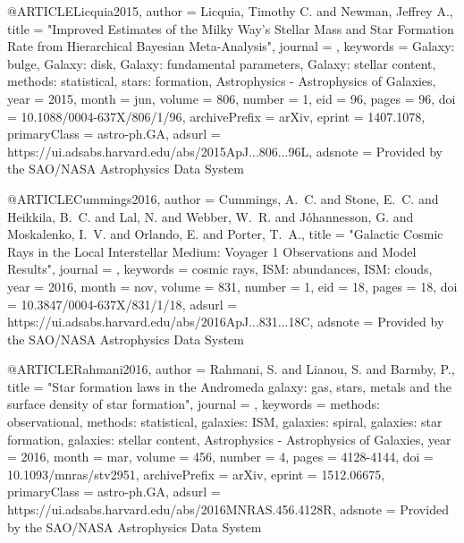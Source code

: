 \documentclass[useAMS,usenatbib]{mnras}
\begin{document}
@ARTICLE{Licquia2015,
       author = {{Licquia}, Timothy C. and {Newman}, Jeffrey A.},
        title = "{Improved Estimates of the Milky Way's Stellar Mass and Star Formation Rate from Hierarchical Bayesian Meta-Analysis}",
      journal = {\apj},
     keywords = {Galaxy: bulge, Galaxy: disk, Galaxy: fundamental parameters, Galaxy: stellar content, methods: statistical, stars: formation, Astrophysics - Astrophysics of Galaxies},
         year = 2015,
        month = jun,
       volume = {806},
       number = {1},
          eid = {96},
        pages = {96},
          doi = {10.1088/0004-637X/806/1/96},
archivePrefix = {arXiv},
       eprint = {1407.1078},
 primaryClass = {astro-ph.GA},
       adsurl = {https://ui.adsabs.harvard.edu/abs/2015ApJ...806...96L},
      adsnote = {Provided by the SAO/NASA Astrophysics Data System}
}

@ARTICLE{Cummings2016,
       author = {{Cummings}, A.~C. and {Stone}, E.~C. and {Heikkila}, B.~C. and
         {Lal}, N. and {Webber}, W.~R. and {J{\'o}hannesson}, G. and
         {Moskalenko}, I.~V. and {Orlando}, E. and {Porter}, T.~A.},
        title = "{Galactic Cosmic Rays in the Local Interstellar Medium: Voyager 1 Observations and Model Results}",
      journal = {\apj},
     keywords = {cosmic rays, ISM: abundances, ISM: clouds},
         year = 2016,
        month = nov,
       volume = {831},
       number = {1},
          eid = {18},
        pages = {18},
          doi = {10.3847/0004-637X/831/1/18},
       adsurl = {https://ui.adsabs.harvard.edu/abs/2016ApJ...831...18C},
      adsnote = {Provided by the SAO/NASA Astrophysics Data System}
}

@ARTICLE{Rahmani2016,
       author = {{Rahmani}, S. and {Lianou}, S. and {Barmby}, P.},
        title = "{Star formation laws in the Andromeda galaxy: gas, stars, metals and the surface density of star formation}",
      journal = {\mnras},
     keywords = {methods: observational, methods: statistical, galaxies: ISM, galaxies: spiral, galaxies: star formation, galaxies: stellar content, Astrophysics - Astrophysics of Galaxies},
         year = 2016,
        month = mar,
       volume = {456},
       number = {4},
        pages = {4128-4144},
          doi = {10.1093/mnras/stv2951},
archivePrefix = {arXiv},
       eprint = {1512.06675},
 primaryClass = {astro-ph.GA},
       adsurl = {https://ui.adsabs.harvard.edu/abs/2016MNRAS.456.4128R},
      adsnote = {Provided by the SAO/NASA Astrophysics Data System}
}
\end{document}
